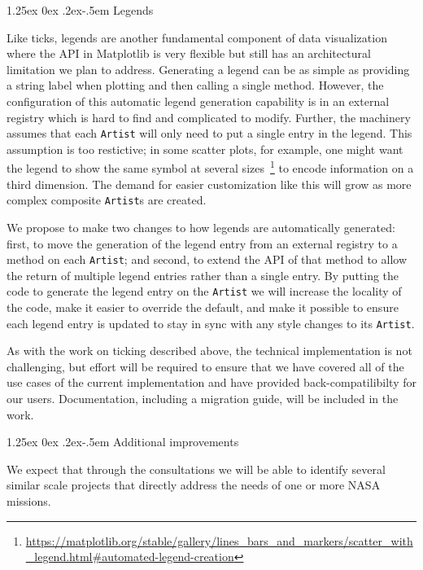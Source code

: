 \documentclass[12pt]{article}
\makeatletter
\numberwithin{page}{section}
\renewcommand{\paragraph}{%
  \@startsection{paragraph}{4}%
  {\z@}{1.25ex \@plus 0ex \@minus .2ex}{-.5em}%
  {\normalfont\normalsize\itshape\bfseries}%
}
\makeatother
\begin{document}
\paragraph{Legends}

Like ticks, legends are another fundamental component of data
visualization where the API in Matplotlib is very flexible but still has
an architectural limitation we plan to address.
Generating a legend can be as simple as providing a string label when plotting and
then calling a single method.  However, the configuration of this automatic
legend generation capability is in an external registry which is hard to find
and complicated to modify.  Further, the machinery assumes that
each \texttt{Artist} will only need to put a single entry in the legend.  This
assumption is too restictive; in
some scatter plots, for example, one might want the legend to show the same
symbol at several
sizes\
\footnote{\url{https://matplotlib.org/stable/gallery/lines_bars_and_markers/scatter_with_legend.html\#automated-legend-creation}}
to encode information on a third dimension.
The demand for easier customization like this will grow as more complex
composite \texttt{Artist}s are created.


We propose to make two changes to how legends are automatically generated: first,
to move the generation of the legend entry from an external registry to a
method on each \texttt{Artist}; and second, to extend the API of that method to
allow the return of multiple legend entries rather than a single entry.  By
putting the code to generate the legend entry on the \texttt{Artist} we will
increase the locality of the code, make it easier to override the default, and
make it possible to ensure each legend entry is updated to stay in sync with any
style changes to its \texttt{Artist}.

As with the work on ticking described above, the technical implementation is not
challenging, but effort will be required to ensure that we have covered all of the use cases of the current
implementation and have provided back-compatilibilty for our users.
Documentation,
including a migration guide, will be included in the work.

\paragraph{Additional improvements}

We expect that through the consultations we will be able to identify several
similar scale projects that directly address the needs of one or more NASA
missions.
\end{document}
